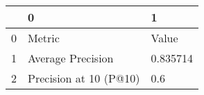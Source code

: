 \begin{tabular}{lll}
\toprule
{} &                       0 &         1 \\
\midrule
0 &                  Metric &     Value \\
1 &       Average Precision &  0.835714 \\
2 &  Precision at 10 (P@10) &       0.6 \\
\bottomrule
\end{tabular}
